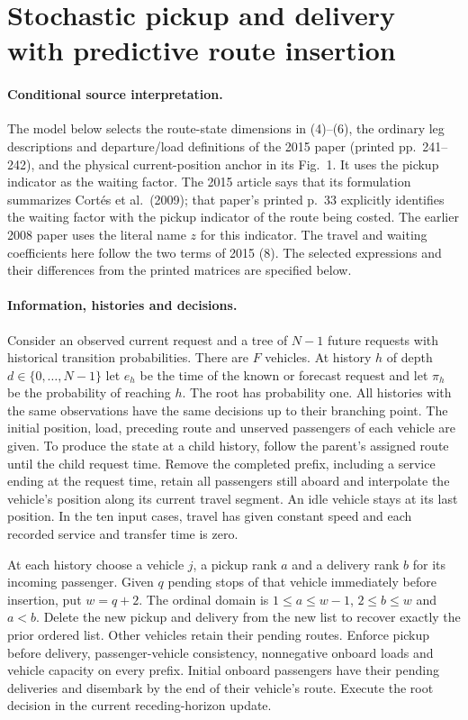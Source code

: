 \documentclass{article}
\begin{document}
\section*{Stochastic pickup and delivery with predictive route insertion}
\paragraph{Conditional source interpretation.}
The model below selects the route-state dimensions in (4)--(6), the ordinary
leg descriptions and departure/load definitions of the 2015 paper (printed
pp.\ 241--242), and the physical current-position anchor in its Fig.\ 1.
It uses the pickup indicator as the waiting factor. The 2015 article says
that its formulation summarizes Cort\'es et al.\ (2009); that paper's
printed p.\ 33 explicitly identifies the waiting factor with the pickup
indicator of the route being costed. The earlier 2008 paper uses the
literal name $z$ for this indicator. The travel and waiting coefficients here
follow the two terms of 2015 (8). The selected expressions and their
differences from the printed matrices are specified below.

\paragraph{Information, histories and decisions.}
Consider an observed current request and a tree of $N-1$ future requests
with historical transition probabilities. There are $F$ vehicles.
At history $h$ of depth $d\in\{0,\ldots,N-1\}$ let $e_h$ be the time
of the known or forecast request and let $\pi_h$ be the probability of
reaching $h$. The root has probability one. All histories with the same
observations have the same decisions up to their branching point.
The initial position, load, preceding route and unserved passengers of each
vehicle are given. To produce the state at a child history, follow the
parent's assigned route until the child request time. Remove the completed
prefix, including a service ending at the request time, retain all
passengers still aboard and interpolate the vehicle's position along
its current travel segment. An idle vehicle stays at its last position.
In the ten input cases, travel has given constant speed and each recorded
service and transfer time is zero.

At each history choose a vehicle $j$, a pickup rank $a$ and a delivery
rank $b$ for its incoming passenger. Given $q$ pending stops of that vehicle
immediately before insertion, put $w=q+2$. The ordinal domain is
$1\leq a\leq w-1$, $2\leq b\leq w$ and $a<b$. Delete the new pickup and
delivery from the new list to recover exactly the prior ordered list.
Other vehicles retain their pending routes. Enforce pickup before delivery,
passenger-vehicle consistency, nonnegative onboard loads and vehicle
capacity on every prefix. Initial onboard passengers have their pending
deliveries and disembark by the end of their vehicle's route. Execute the
root decision in the current receding-horizon update.
\end{document}
